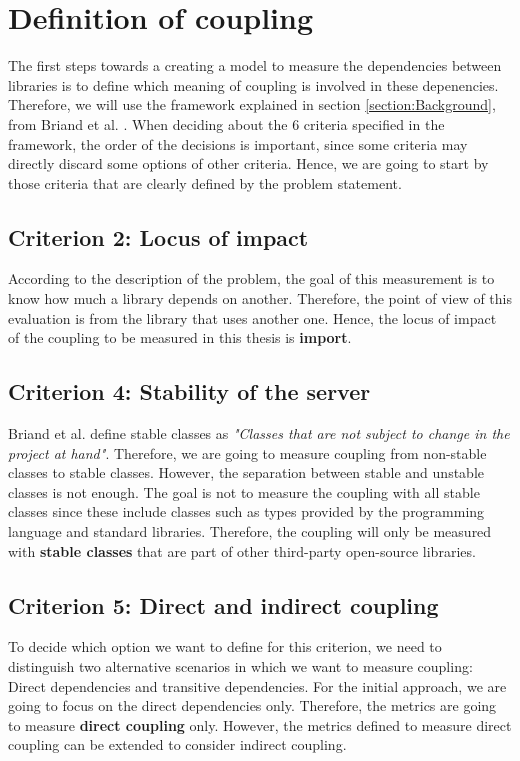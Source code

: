 \documentclass[a4paper]{article}
\begin{document}
\section{Definition of coupling}
The first steps towards a creating a model to measure the dependencies between libraries is to define which meaning of coupling is involved in these depenencies. Therefore, we will use the framework explained in section \ref{section:Background}, from Briand et al. \cite{briand1999unified}. When deciding about the 6 criteria specified in the framework, the order of the decisions is important, since some criteria may directly discard some options of other criteria. Hence, we are going to start by those criteria that are clearly defined by the problem statement.

\subsection{Criterion 2: Locus of impact}
According to the description of the problem, the goal of this measurement is to know how much a library depends on another. Therefore, the point of view of this evaluation is from the library that uses another one. Hence, the locus of impact of the coupling to be measured in this thesis is \textbf{import}.

\subsection{Criterion 4: Stability of the server}
Briand et al. \cite{briand1999unified} define stable classes as \textit{"Classes that are not subject to change in the project at hand"}. Therefore, we are going to measure coupling from non-stable classes to stable classes.
However, the separation between stable and unstable classes is not enough. The goal is not to measure the coupling with all stable classes since these include classes such as types provided by the programming language and standard libraries. Therefore, the coupling will only be measured with \textbf{stable classes} that are part of other third-party open-source libraries.

\subsection{Criterion 5: Direct and indirect coupling}
To decide which option we want to define for this criterion, we need to distinguish two alternative scenarios in which we want to measure coupling: Direct dependencies and transitive dependencies. For the initial approach, we are going to focus on the direct dependencies only. Therefore, the metrics are going to measure \textbf{direct coupling} only. However, the metrics defined to measure direct coupling can be extended to consider indirect coupling.
\end{document}
